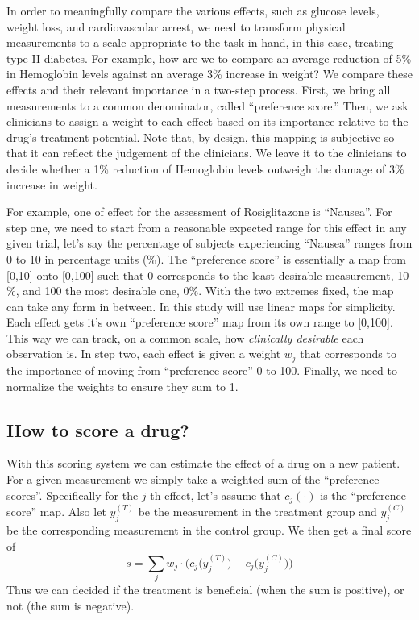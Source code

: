 \documentclass[11pt]{article}
\begin{document}
In order to meaningfully compare the various effects, such as glucose
levels, weight loss, and cardiovascular arrest, we need to transform
physical measurements to a scale appropriate to the task in hand, in
this case, treating type II diabetes. For example, how are we to compare
an average reduction of 5\% in Hemoglobin levels against an average 3\%
increase in weight? We compare these effects and their relevant
importance in a two-step process. First, we bring all measurements to a
common denominator, called ``preference score.'' Then, we ask clinicians
to assign a weight to each effect based on its importance relative to
the drug's treatment potential. Note that, by design, this mapping is
subjective so that it can reflect the judgement of the clinicians. We
leave it to the clinicians to decide whether a 1\% reduction of
Hemoglobin levels outweigh the damage of 3\% increase in weight.

For example, one of effect for the assessment of Rosiglitazone is
``Nausea''. For step one, we need to start from a reasonable expected
range for this effect in any given trial, let's say the percentage of
subjects experiencing ``Nausea'' ranges from 0 to 10 in percentage units
(\%). The ``preference score'' is essentially a map from {[}0,10{]} onto
{[}0,100{]} such that 0 corresponds to the least desirable measurement,
10 \%, and 100 the most desirable one, 0\%. With the two extremes fixed,
the map can take any form in between. In this study will use linear maps
for simplicity. Each effect gets it's own ``preference score'' map from
its own range to {[}0,100{]}. This way we can track, on a common scale,
how \emph{clinically desirable} each observation is. In step two, each
effect is given a weight \(w_j\) that corresponds to the importance of
moving from ``preference score'' 0 to 100. Finally, we need to normalize
the weights to ensure they sum to 1.

\hypertarget{how-to-score-a-drug}{%
\subsection{How to score a drug?}\label{how-to-score-a-drug}}

With this scoring system we can estimate the effect of a drug on a new
patient. For a given measurement we simply take a weighted sum of the
``preference scores''. Specifically for the \(j\)-th effect, let's
assume that \(c_j(\cdot)\) is the ``preference score'' map. Also let
\(y_j^{(T)}\) be the measurement in the treatment group and
\(y_j^{(C)}\) be the corresponding measurement in the control group. We
then get a final score of
\[s = \sum_j w_j \cdot \big( c_j \big(y_j^{(T)}\big) - c_j \big(y_j^{(C)}\big) \big) \]
Thus we can decided if the treatment is beneficial (when the sum is
positive), or not (the sum is negative).
\end{document}
